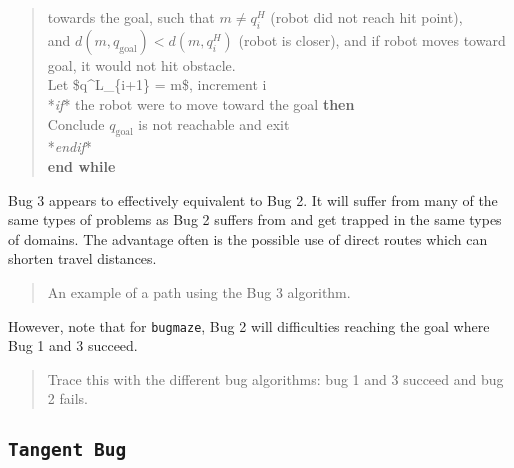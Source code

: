 \begin{quote}
towards the goal, such that \(m\neq q^H_{i}\) (robot did not reach hit
point),\\
\hspace*{0.333em}\hspace*{0.333em}and
\(d(m,q_{\text{goal}}) < d(m, q^H_{i})\) (robot is closer), and if robot
moves toward goal, it would not hit obstacle.\\
\hspace*{0.333em}\hspace*{0.333em}Let \$q\^{}L\_\{i+1\} = m\$, increment
i\\
\hspace*{0.333em}\hspace*{0.333em}*\emph{if}* the robot were to move
toward the goal \textbf{then}\\
\hspace*{0.333em}\hspace*{0.333em}\hspace*{0.333em}\hspace*{0.333em}Conclude
\(q_{\text{goal}}\) is not reachable and exit\\
\hspace*{0.333em}\hspace*{0.333em}*\emph{endif}*\\
\textbf{end while}
\end{quote}

Bug 3 appears to effectively equivalent to Bug 2. It will suffer from
many of the same types of problems as Bug 2 suffers from and get trapped
in the same types of domains. The advantage often is the possible use of
direct routes which can shorten travel distances.

\begin{quote}
An example of a path using the Bug 3 algorithm.
\end{quote}

However, note that for \texttt{bugmaze}, Bug 2 will difficulties
reaching the goal where Bug 1 and 3 succeed.

\begin{quote}
Trace this with the different bug algorithms: bug 1 and 3 succeed and
bug 2 fails.
\end{quote}

\hypertarget{tangent-bug}{%
\subsection{\texorpdfstring{\texttt{Tangent\ Bug}}{Tangent Bug}}\label{tangent-bug}}

